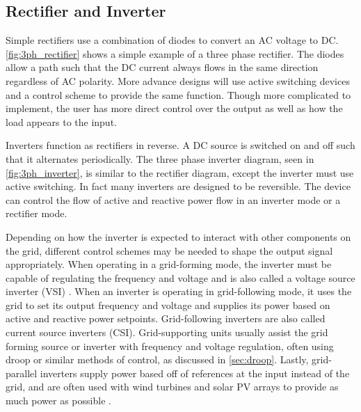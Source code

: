 

\subsection{Rectifier and Inverter}
Simple rectifiers use a combination of diodes to convert an AC voltage to DC. \autoref{fig:3ph_rectifier} shows a simple example of a three phase rectifier. The diodes allow a path such that the DC current always flows in the same direction regardless of AC polarity. More advance designs will use active switching devices and a control scheme to provide the same function. Though more complicated to implement, the user has more direct control over the output as well as how the load appears to the input. 



Inverters function as rectifiers in reverse. A DC source is switched on and off such that it alternates periodically. The three phase inverter diagram, seen in \autoref{fig:3ph_inverter}, is similar to the rectifier diagram, except the inverter must use active switching. In fact many inverters are designed to be reversible. The device can control the flow of active and reactive power flow in an inverter mode or a rectifier mode.


Depending on how the inverter is expected to interact with other components on the grid, different control schemes may be needed to shape the output signal appropriately. When operating in a grid-forming mode, the inverter must be capable of regulating the frequency and voltage and is also called a voltage source inverter (VSI) \cite{Engler}. When an inverter is operating in grid-following mode, it uses the grid to set its output frequency and voltage and supplies its power based on active and reactive power setpoints. Grid-following inverters are also called current source inverters (CSI). Grid-supporting units usually assist the grid forming source or inverter with frequency and voltage regulation, often using droop or similar methods of control, as discussed in \autoref{sec:droop}. Lastly, grid-parallel inverters supply power based off of references at the input instead of the grid, and are often used with wind turbines and solar PV arrays to provide as much power as possible \cite{Mohd2009}.

